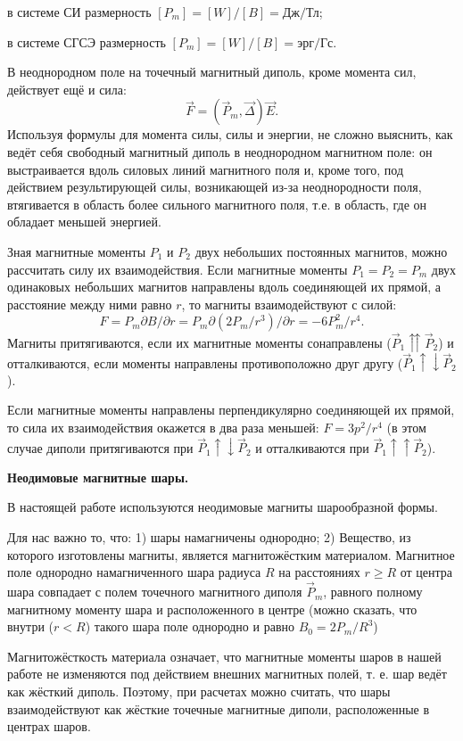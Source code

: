 \documentclass[a4paper, fontsize=14pt]{article}
\begin{document}
	\quad в системе СИ размерность $[P_m] = [W]/[B] = \text{Дж/Тл}$;
	
	\quad в системе СГСЭ размерность $[P_m] = [W]/[B] = \text{эрг/Гс}$.

	В неоднородном поле на точечный магнитный диполь, кроме момента сил, действует ещё и сила:
\[
	\vec F = (\vec P_m, \vec \Delta) \vec E.
\]
Используя формулы для момента силы, силы и энергии, не сложно выяснить, как ведёт себя свободный магнитный диполь в неоднородном магнитном поле: он выстраивается вдоль силовых линий магнитного поля и, кроме того, под действием результирующей силы, возникающей из-за неоднородности поля, втягивается в область более сильного магнитного поля, т.е. в область, где он обладает меньшей энергией.

Зная магнитные моменты $P_1$ и $P_2$ двух небольших постоянных магнитов, можно рассчитать силу их взаимодействия. Если магнитные моменты $P_1 = P_2 = P_m$ двух одинаковых небольших магнитов направлены вдоль соединяющей их прямой, а расстояние между ними равно $r$, то магниты взаимодействуют с силой:
\[
	F = P_m \partial B / \partial r = P_m \partial(2P_m / r^3)/\partial r = - 6 P_m^2 / r^4.
\]
Магниты притягиваются, если их магнитные моменты сонаправлены ($\vec P_1 \upuparrows \vec P_2$) и отталкиваются, если моменты направлены противоположно друг другу ($\vec P_1 \uparrow \downarrow \vec P_2$).

Если магнитные моменты направлены перпендикулярно соединяющей их прямой, то сила их взаимодействия окажется в два раза меньшей: $F = 3p^2 / r^4$ (в этом случае диполи притягиваются при $\vec P_1 \uparrow \downarrow \vec P_2$ и отталкиваются при $\vec P_1 \uparrow \uparrow \vec P_2$).
	
	\textbf{Неодимовые магнитные шары.}
	
	В настоящей работе используются неодимовые магниты шарообразной формы.
	
	Для нас важно то, что:
		1) шары намагничены однородно;
		2) Вещество, из которого изготовлены магниты, является магнитожёстким материалом.
		Магнитное поле однородно намагниченного шара радиуса $R$ на расстояниях $r \ge R$ от центра шара совпадает с полем точечного магнитного диполя $\vec P_m$, равного полному магнитному моменту шара и расположенного в центре (можно сказать, что внутри ($r < R$) такого шара поле однородно и равно $B_0 = 2 P_m / R^3$)
		
		Магнитожёсткость материала означает, что магнитные моменты шаров в нашей работе не изменяются под действием внешних магнитных полей, т. е. шар ведёт как жёсткий диполь. Поэтому, при расчетах можно считать, что шары взаимодействуют как жёсткие точечные магнитные диполи, расположенные в центрах шаров.
		
\end{document}
